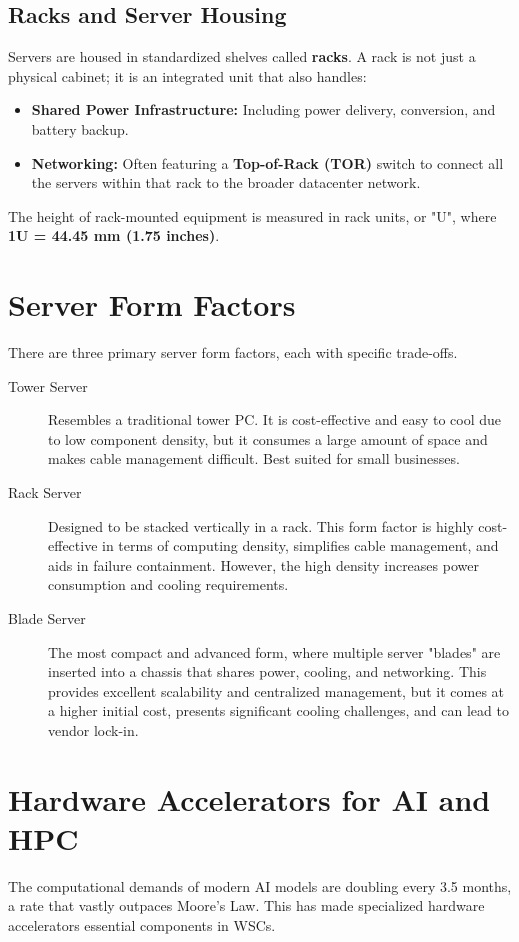 \subsection{Racks and Server Housing}
Servers are housed in standardized shelves called \textbf{racks}. A rack is not just a physical cabinet; it is an integrated unit that also handles:
\begin{itemize}
    \item \textbf{Shared Power Infrastructure:} Including power delivery, conversion, and battery backup.
    \item \textbf{Networking:} Often featuring a \textbf{Top-of-Rack (TOR)} switch to connect all the servers within that rack to the broader datacenter network.
\end{itemize}
The height of rack-mounted equipment is measured in rack units, or "U", where \textbf{1U = 44.45 mm (1.75 inches)}.

\section{Server Form Factors}
There are three primary server form factors, each with specific trade-offs.

\begin{description}
    \item[Tower Server] Resembles a traditional tower PC. It is cost-effective and easy to cool due to low component density, but it consumes a large amount of space and makes cable management difficult. Best suited for small businesses.
    \item[Rack Server] Designed to be stacked vertically in a rack. This form factor is highly cost-effective in terms of computing density, simplifies cable management, and aids in failure containment. However, the high density increases power consumption and cooling requirements.
    \item[Blade Server] The most compact and advanced form, where multiple server "blades" are inserted into a chassis that shares power, cooling, and networking. This provides excellent scalability and centralized management, but it comes at a higher initial cost, presents significant cooling challenges, and can lead to vendor lock-in.
\end{description}

\section{Hardware Accelerators for AI and HPC}
The computational demands of modern AI models are doubling every 3.5 months, a rate that vastly outpaces Moore's Law. This has made specialized hardware accelerators essential components in WSCs.

